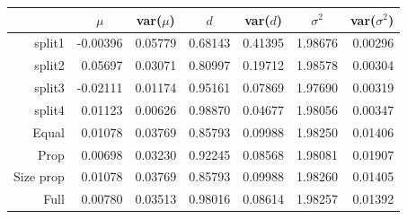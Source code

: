\documentclass[11pt,a5paper,twoside]{book}
\begin{document}
{\begin{table}[h]
\vspace*{2mm}
\centering
\def\arraystretch{0.6}\begin{tabular}{rrrrrrr}
  \hline\hline
 & \multicolumn{1}{c}{$\mu$} & \multicolumn{1}{c}{\mbox{var}($\mu$)} & \multicolumn{1}{c}{$d$} & \multicolumn{1}{c}{\mbox{var}($d$)} & \multicolumn{1}{c}{$\sigma^2$} & \multicolumn{1}{c}{\mbox{var}($\sigma^2$)} \\
  \hline
split1 & -0.00396 & 0.05779 & 0.68143 & 0.41395 & 1.98676 & 0.00296 \\
  split2 & 0.05697 & 0.03071 & 0.80997 & 0.19712 & 1.98578 & 0.00304 \\
  split3 & -0.02111 & 0.01174 & 0.95161 & 0.07869 & 1.97690 & 0.00319 \\
  split4 & 0.01123 & 0.00626 & 0.98870 & 0.04677 & 1.98056 & 0.00347 \\
   \hline
Equal & 0.01078 & 0.03769 & 0.85793 & 0.09988 & 1.98250 & 0.01406 \\
  Prop & 0.00698 & 0.03230 & 0.92245 & 0.08568 & 1.98081 & 0.01907 \\
  Size prop & 0.01078 & 0.03769 & 0.85793 & 0.09988 & 1.98260 & 0.01405 \\
  Full & 0.00780 & 0.03513 & 0.98016 & 0.08614 & 1.98257 & 0.01392 \\
   \hline
\hline
\end{tabular}
\end{table}


}
\end{document}

